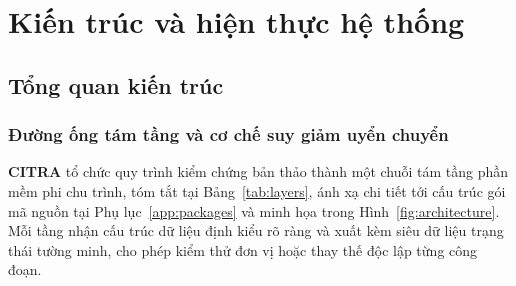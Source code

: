 \chapter{Kiến trúc và hiện thực hệ thống}
\label{chap:architecture}

\section{Tổng quan kiến trúc}

\subsection{Đường ống tám tầng và cơ chế suy giảm uyển chuyển}

\textbf{CITRA} tổ chức quy trình kiểm chứng bản thảo thành một chuỗi tám tầng phần mềm phi chu trình, tóm tắt tại Bảng~\ref{tab:layers}, ánh xạ chi tiết tới cấu trúc gói mã nguồn tại Phụ lục~\ref{app:packages} và minh họa trong Hình~\ref{fig:architecture}. Mỗi tầng nhận cấu trúc dữ liệu định kiểu rõ ràng và xuất kèm siêu dữ liệu trạng thái tường minh, cho phép kiểm thử đơn vị hoặc thay thế độc lập từng công đoạn.

